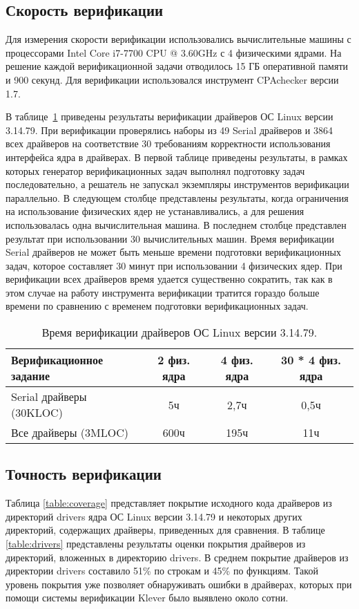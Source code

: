 \subsection{Скорость верификации}
Для измерения скорости верификации использовались вычислительные машины с процессорами Intel Core i7-7700 CPU @ 3.60GHz с 4 физическими ядрами.
На решение каждой верификационной задачи отводилось 15 ГБ оперативной памяти и 900 секунд.
Для верификации использовался инструмент CPAchecker версии 1.7.

В таблице~\ref{table:speed} приведены результаты верификации драйверов ОС Linux версии 3.14.79.
При верификации проверялись наборы из 49 Serial драйверов и 3864 всех драйверов на соответствие 30 требованиям корректности использования интерфейса ядра в драйверах.
В первой таблице приведены результаты, в рамках которых генератор верификационных задач выполнял подготовку задач последовательно, а решатель не запускал экземпляры инструментов верификации параллельно.
В следующем столбце представлены результаты, когда ограничения на использование физических ядер не устанавливались, а для решения использовалась одна вычислительная машина.
В последнем столбце представлен результат при использовании 30 вычислительных машин.
Время верификации Serial драйверов не может быть меньше времени подготовки верификационных задач, которое составляет 30 минут при использовании 4 физических ядер.
При верификации всех драйверов время удается существенно сократить, так как в этом случае на работу инструмента верификации тратится гораздо больше времени по сравнению с временем подготовки верификационных задач.

\begin{table}
\centering
\begin{tabular}{| l | c | c | c |}
\hline
Верификационное задание & 2 физ. ядра & 4 физ. ядра & 30 * 4 физ. ядра \\
\hline 
Serial драйверы (30KLOC) & 5ч & 2,7ч & 0,5ч \\
\hline 
Все драйверы (3MLOC) & 600ч & 195ч & 11ч \\
\hline
\end{tabular}
\caption{Время верификации драйверов ОС Linux версии 3.14.79.}
\label{table:speed}
\end{table}

\subsection{Точность верификации}

Таблица \ref{table:coverage} представляет покрытие исходного кода драйверов из директорий drivers ядра ОС Linux версии 3.14.79 и некоторых других директорий, содержащих драйверы, приведенных для сравнения.
В таблице \ref{table:drivers} представлены результаты оценки покрытия драйверов из директорий, вложенных в директорию drivers.
В среднем покрытие драйверов из директории drivers составило 51\% по строкам и 45\% по функциям.
Такой уровень покрытия уже позволяет обнаруживать ошибки в драйверах, которых при помощи системы верификации Klever было выявлено около сотни.

